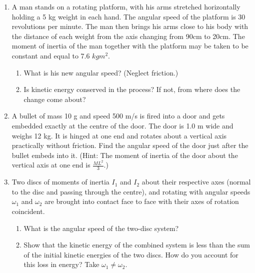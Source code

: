 \begin{enumerate}[label=\arabic*.,ref=\thesubsection.\theenumi]
\begin{figure}[!ht]
\caption{}
\label{fig:7.40}
\end{figure}
%
\item A man stands on a rotating platform, with his arms stretched horizontally holding a 5 kg weight in each hand. The angular speed of the platform is 30 revolutions per minute. The man then brings his arms close to his body with the distance of each weight from the axis changing from 90cm to 20cm. The moment of inertia of the man together with the platform may be taken to be constant and equal to 7.6 $kg m^2$.
\begin{enumerate}[label=(\alph*)]
\item  What is his new angular speed? (Neglect friction.) 
\item  Is kinetic energy conserved in the process? If not, from where does the change come about?
\end{enumerate}
\item A bullet of mass 10 g and speed 500 m/s is fired into a door and gets embedded exactly at the centre of the door. The door is 1.0 m wide and weighs 12 kg. It is hinged at one end and rotates about a vertical axis practically without friction. Find the angular speed of the door just after the bullet embeds into it. (Hint: The moment of inertia of the door about the vertical axis at one end is $\frac{ML^2}{3}$.)
\item  Two discs of moments of inertia $I_1$ and $I_2$ about their respective axes (normal to the disc and passing through the centre), and rotating with angular speeds $\omega_1$ and $\omega_2$ are brought into contact face to face with their axes of rotation coincident. 
\begin{enumerate}[label=(\alph*)]
\item  What is the angular speed of the two-disc system? 
\item  Show that the kinetic energy of the combined system is less than the sum of the initial kinetic energies of the two discs. How do you account for this loss in energy? Take $\omega_1 \ne \omega_2$.
\end{enumerate}


\end{enumerate}
